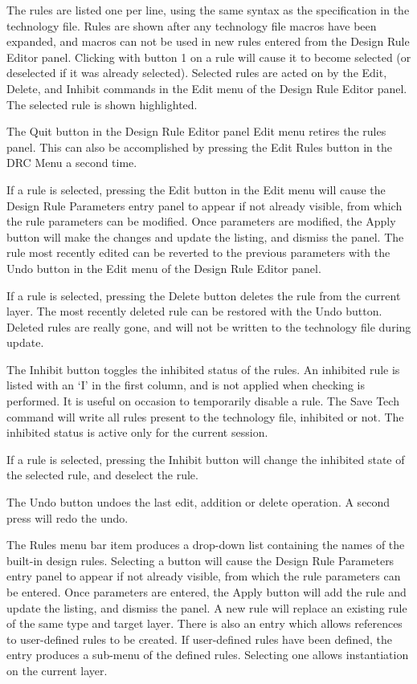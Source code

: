 The rules are listed one per line, using the same syntax as the
specification in the technology file.  Rules are shown after any
technology file macros have been expanded, and macros can not be used
in new rules entered from the {\cb Design Rule Editor} panel. 
Clicking with button 1 on a rule will cause it to become selected (or
deselected if it was already selected).  Selected rules are acted on by
the {\cb Edit}, {\cb Delete}, and {\cb Inhibit} commands in the {\cb
Edit} menu of the {\cb Design Rule Editor} panel.  The selected rule
is shown highlighted.

The {\cb Quit} button in the {\cb Design Rule Editor} panel {\cb Edit}
menu retires the rules panel.  This can also be accomplished by
pressing the {\cb Edit Rules} button in the {\cb DRC Menu} a second
time.

If a rule is selected, pressing the {\cb Edit} button in the {\cb
Edit} menu will cause the {\cb Design Rule Parameters} entry panel to
appear if not already visible, from which the rule parameters can be
modified.  Once parameters are modified, the {\cb Apply} button will
make the changes and update the listing, and dismiss the panel.  The
rule most recently edited can be reverted to the previous parameters
with the {\cb Undo} button in the {\cb Edit} menu of the {\cb Design
Rule Editor} panel.

If a rule is selected, pressing the {\cb Delete} button deletes the
rule from the current layer.  The most recently deleted rule can be
restored with the {\cb Undo} button.  Deleted rules are really gone,
and will not be written to the technology file during update.

The {\cb Inhibit} button toggles the inhibited status of the rules. 
An inhibited rule is listed with an `I' in the first column, and is
not applied when checking is performed.  It is useful on occasion to
temporarily disable a rule.  The {\cb Save Tech} command will write
all rules present to the technology file, inhibited or not.  The
inhibited status is active only for the current {\Xic} session.

If a rule is selected, pressing the {\cb Inhibit} button will change the
inhibited state of the selected rule, and deselect the rule.

The {\cb Undo} button undoes the last edit, addition or delete
operation.  A second press will redo the undo.

The {\cb Rules} menu bar item produces a drop-down list containing the
names of the built-in design rules.  Selecting a button will cause the
{\cb Design Rule Parameters} entry panel to appear if not already
visible, from which the rule parameters can be entered.  Once
parameters are entered, the {\cb Apply} button will add the rule and
update the listing, and dismiss the panel.  A new rule will replace an
existing rule of the same type and target layer.  There is also an
entry which allows references to user-defined rules to be created.  If
user-defined rules have been defined, the entry produces a sub-menu of
the defined rules.  Selecting one allows instantiation on the current
layer.

